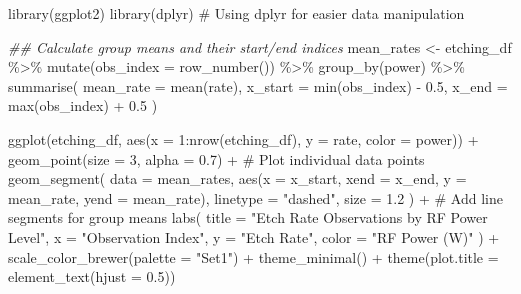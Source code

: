 \documentclass[
  letterpaper,
]{scrbook}
\newenvironment{Shaded}{\begin{snugshade}}{\end{snugshade}}
\newcommand{\AttributeTok}[1]{\textcolor[rgb]{0.40,0.45,0.13}{#1}}
\newcommand{\CommentTok}[1]{\textcolor[rgb]{0.37,0.37,0.37}{#1}}
\newcommand{\DecValTok}[1]{\textcolor[rgb]{0.68,0.00,0.00}{#1}}
\newcommand{\DocumentationTok}[1]{\textcolor[rgb]{0.37,0.37,0.37}{\textit{#1}}}
\newcommand{\FloatTok}[1]{\textcolor[rgb]{0.68,0.00,0.00}{#1}}
\newcommand{\FunctionTok}[1]{\textcolor[rgb]{0.28,0.35,0.67}{#1}}
\newcommand{\NormalTok}[1]{\textcolor[rgb]{0.00,0.23,0.31}{#1}}
\newcommand{\OtherTok}[1]{\textcolor[rgb]{0.00,0.23,0.31}{#1}}
\newcommand{\SpecialCharTok}[1]{\textcolor[rgb]{0.37,0.37,0.37}{#1}}
\newcommand{\StringTok}[1]{\textcolor[rgb]{0.13,0.47,0.30}{#1}}
\begin{document}
\begin{Shaded}
\begin{Highlighting}[]
\FunctionTok{library}\NormalTok{(ggplot2)}
\FunctionTok{library}\NormalTok{(dplyr) }\CommentTok{\# Using dplyr for easier data manipulation}

\DocumentationTok{\#\# Calculate group means and their start/end indices}
\NormalTok{mean\_rates }\OtherTok{\textless{}{-}}\NormalTok{ etching\_df }\SpecialCharTok{\%\textgreater{}\%}
  \FunctionTok{mutate}\NormalTok{(}\AttributeTok{obs\_index =} \FunctionTok{row\_number}\NormalTok{()) }\SpecialCharTok{\%\textgreater{}\%}
  \FunctionTok{group\_by}\NormalTok{(power) }\SpecialCharTok{\%\textgreater{}\%}
  \FunctionTok{summarise}\NormalTok{(}
    \AttributeTok{mean\_rate =} \FunctionTok{mean}\NormalTok{(rate),}
    \AttributeTok{x\_start =} \FunctionTok{min}\NormalTok{(obs\_index) }\SpecialCharTok{{-}} \FloatTok{0.5}\NormalTok{,}
    \AttributeTok{x\_end =} \FunctionTok{max}\NormalTok{(obs\_index) }\SpecialCharTok{+} \FloatTok{0.5}
\NormalTok{  )}

\FunctionTok{ggplot}\NormalTok{(etching\_df, }\FunctionTok{aes}\NormalTok{(}\AttributeTok{x =} \DecValTok{1}\SpecialCharTok{:}\FunctionTok{nrow}\NormalTok{(etching\_df), }\AttributeTok{y =}\NormalTok{ rate, }\AttributeTok{color =}\NormalTok{ power)) }\SpecialCharTok{+}
  \FunctionTok{geom\_point}\NormalTok{(}\AttributeTok{size =} \DecValTok{3}\NormalTok{, }\AttributeTok{alpha =} \FloatTok{0.7}\NormalTok{) }\SpecialCharTok{+} \CommentTok{\# Plot individual data points}
  \FunctionTok{geom\_segment}\NormalTok{(}
    \AttributeTok{data =}\NormalTok{ mean\_rates, }
    \FunctionTok{aes}\NormalTok{(}\AttributeTok{x =}\NormalTok{ x\_start, }\AttributeTok{xend =}\NormalTok{ x\_end, }\AttributeTok{y =}\NormalTok{ mean\_rate, }\AttributeTok{yend =}\NormalTok{ mean\_rate),}
    \AttributeTok{linetype =} \StringTok{"dashed"}\NormalTok{, }
    \AttributeTok{size =} \FloatTok{1.2}
\NormalTok{  ) }\SpecialCharTok{+} \CommentTok{\# Add line segments for group means}
  \FunctionTok{labs}\NormalTok{(}
    \AttributeTok{title =} \StringTok{"Etch Rate Observations by RF Power Level"}\NormalTok{,}
    \AttributeTok{x =} \StringTok{"Observation Index"}\NormalTok{,}
    \AttributeTok{y =} \StringTok{"Etch Rate"}\NormalTok{,}
    \AttributeTok{color =} \StringTok{"RF Power (W)"}
\NormalTok{  ) }\SpecialCharTok{+}
  \FunctionTok{scale\_color\_brewer}\NormalTok{(}\AttributeTok{palette =} \StringTok{"Set1"}\NormalTok{) }\SpecialCharTok{+}
  \FunctionTok{theme\_minimal}\NormalTok{() }\SpecialCharTok{+}
  \FunctionTok{theme}\NormalTok{(}\AttributeTok{plot.title =} \FunctionTok{element\_text}\NormalTok{(}\AttributeTok{hjust =} \FloatTok{0.5}\NormalTok{))}
\end{Highlighting}
\end{Shaded}
\end{document}
